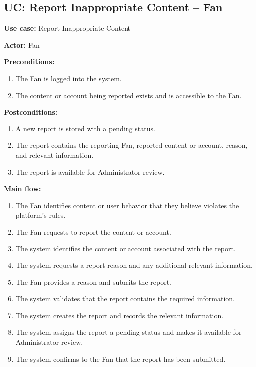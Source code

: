 \documentclass[11pt]{report}
\begin{document}
\subsection{UC: Report Inappropriate Content -- Fan}

{\bfseries Use case:} Report Inappropriate Content

{\bfseries Actor:} Fan

{\bfseries Preconditions:}
\begin{enumerate}
    \item The Fan is logged into the system.
    \item The content or account being reported exists and is accessible to the Fan.
\end{enumerate}

{\bfseries Postconditions:}
\begin{enumerate}
    \item A new report is stored with a pending status.
    \item The report contains the reporting Fan, reported content or account, reason, and relevant information.
    \item The report is available for Administrator review.
\end{enumerate}

{\bfseries Main flow:}
\begin{enumerate}
    \item The Fan identifies content or user behavior that they believe violates the platform's rules.
    \item The Fan requests to report the content or account.
    \item The system identifies the content or account associated with the report.
    \item The system requests a report reason and any additional relevant information.
    \item The Fan provides a reason and submits the report.
    \item The system validates that the report contains the required information.
    \item The system creates the report and records the relevant information.
    \item The system assigns the report a pending status and makes it available for Administrator review.
    \item The system confirms to the Fan that the report has been submitted.
\end{enumerate}
\end{document}
